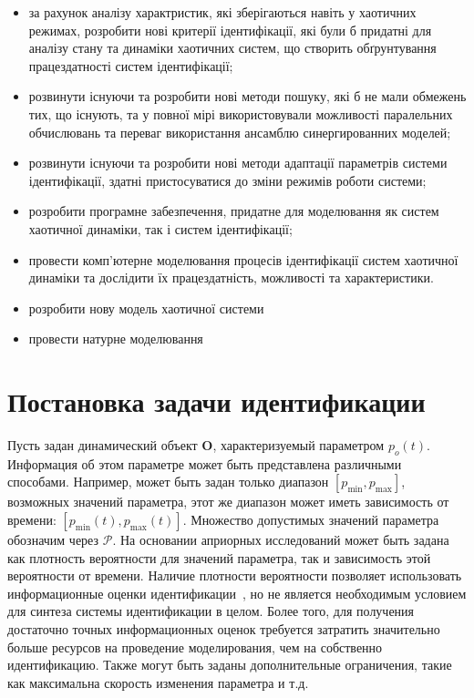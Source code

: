 \begin{itemize}

  \item
    за рахунок аналізу характристик, які зберігаються навіть
    у хаотичних режимах,
    розробити нові критерії ідентифікації,
    які були б придатні для аналізу стану та динаміки
    хаотичних систем, що створить обґрунтування працездатності систем
    ідентифікації;

  \item
  розвинути існуючи та розробити нові методи пошуку, які б не мали
  обмежень тих, що існують, та у повної мірі використовували можливості
  паралельних обчислювань та переваг використання ансамблю
  синергированних моделей;

  \item
  розвинути існуючи та розробити нові методи адаптації параметрів
  системи ідентифікації, здатні пристосуватися до зміни режимів роботи
  системи;

  \item
  розробити програмне забезпечення, придатне для моделювання як систем
  хаотичної динаміки, так і систем ідентифікації;

  \item
  провести комп'ютерне моделювання процесів ідентифікації систем
  хаотичної динаміки та дослідити їх працездатність, можливості та
  характеристики.

  \item
    розробити нову модель хаотичної системи

  \item
    провести натурне моделювання

\end{itemize}




\section{Постановка задачи идентификации}  %

Пусть задан динамический объект $ \mathbf{O}$, характеризуемый параметром $p_o(t)$.
Информация об этом параметре может быть представлена
различными способами. Например, может быть задан только диапазон
$[p_{\min}, p_{\max}]$,
возможных значений параметра,
этот же диапазон может иметь зависимость от времени:
$[p_{\min}(t), p_{\max}(t)]$.
Множество допустимых значений параметра обозначим через $\mathcal{P}$.
На основании априорных исследований может
быть задана как плотность вероятности для значений параметра,
так и зависимость этой вероятности от времени. Наличие плотности вероятности
позволяет использовать информационные оценки идентификации~\cite{info_cipkin,atu_asau10},
но не является необходимым условием для синтеза системы идентификации в целом.
Более того, для получения достаточно точных информационных оценок
требуется затратить значительно больше ресурсов на проведение моделирования,
чем на собственно идентификацию.
Также могут быть заданы дополнительные ограничения, такие как максимальна скорость
изменения параметра и т.д.

